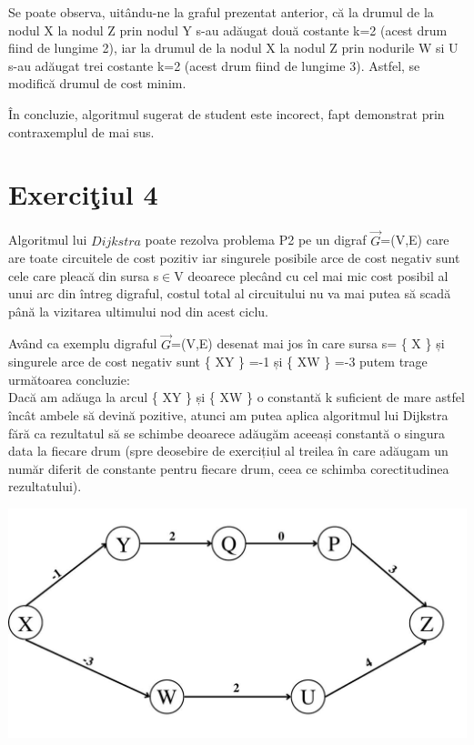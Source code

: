\documentclass[12pt]{article}
\begin{document}
Se poate observa, uitându-ne la graful prezentat anterior, că la drumul de la nodul X la nodul Z prin nodul Y s-au adăugat două costante k=2 (acest drum fiind de lungime 2), iar la drumul de la nodul X la nodul Z prin nodurile W si U s-au adăugat trei costante k=2 (acest drum fiind de lungime 3). Astfel, se modifică drumul de cost minim.

În concluzie, algoritmul sugerat de student este incorect, fapt demonstrat prin contraxemplul de mai sus.

\section{Exerci\c{t}iul 4}

Algoritmul lui $Dijkstra$ poate rezolva problema P2 pe un digraf $\vec{G}$=(V,E) care are toate circuitele de cost pozitiv iar singurele posibile arce de cost negativ sunt cele care pleacă din sursa s$\in$V deoarece plecând cu cel mai mic cost posibil al unui arc din întreg digraful, costul total al circuitului nu va mai putea să scadă până la vizitarea ultimului nod din acest ciclu.

Având ca exemplu digraful $\vec{G}$=(V,E) desenat mai jos în care sursa s= \{ X \} și singurele arce de cost negativ sunt \{ XY \} =-1 și \{ XW \} =-3 putem trage următoarea concluzie: \\
Dacă am adăuga la arcul \{ XY \} și \{ XW \} o constantă k suficient de mare astfel încât ambele să devină pozitive, atunci am putea aplica algoritmul lui Dijkstra fără ca rezultatul să se schimbe deoarece adăugăm aceeași constantă o singura data la fiecare drum (spre deosebire de exercițiul al treilea în care adăugam un număr diferit de constante pentru fiecare drum, ceea ce schimba corectitudinea rezultatului).
    
	
\includegraphics[scale=0.35]{Tema_4.jpg}
  
\end{document}
